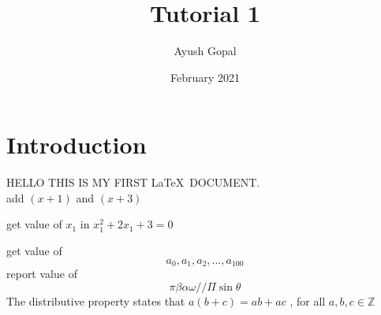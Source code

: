 \documentclass{article}
\title{Tutorial 1}
\author{Ayush Gopal}
\date{February 2021}
\begin{document}
\maketitle

\section{Introduction}

HELLO THIS IS MY FIRST  \LaTeX\ DOCUMENT.\\[6pt]

add $(x+1)$ and $(x+3)$


get value of $x_1$ in $x_1^2+2x_1+3=0$

get value of $$a_0,a_1,a_2 ,\ldots, a_{100}$$
report value of $$\pi  \beta \alpha \omega//   \Pi \sin \theta $$
The distributive property states that $a(b+c)=ab+ac$ , for all $a,b,c \in \mathbb{Z}$
\end{document}
